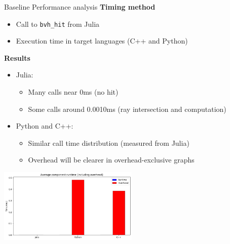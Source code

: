 \begin{frame}{Baseline Performance analysis}
        \textbf{Timing method}
        \begin{itemize}
            \item Call to \texttt{bvh\_hit} from Julia
            \item Execution time in target languages (C++ and Python)
        \end{itemize}
        \pause
        \textbf{Results}
        \begin{itemize}
            \item Julia: 
            \begin{itemize}
                \item Many calls near 0ms (no hit)
                \item Some calls around 0.0010ms (ray intersection and computation)
            \end{itemize}
            \item Python and C++:
            \begin{itemize}
                \item Similar call time distribution (measured from Julia)
                \item Overhead will be clearer in overhead-exclusive graphs
            \end{itemize}
        \end{itemize}
    \begin{center}
        \includegraphics[width=0.5\textwidth]{assets/time-and-overhead.png} %
    \end{center}
\end{frame}